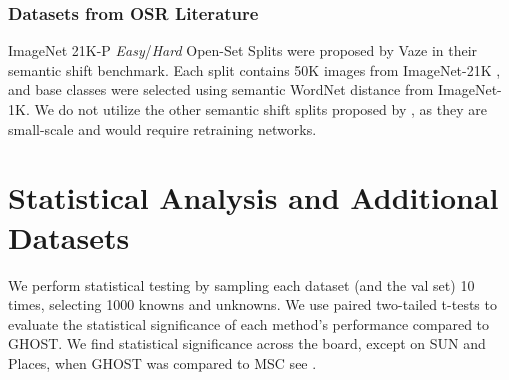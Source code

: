 \subsubsection{Datasets from OSR Literature}
\label{sec:datasets}
ImageNet 21K-P \emph{Easy}/\emph{Hard} Open-Set Splits were proposed by Vaze  in their semantic shift benchmark. 
Each split contains 50K images from ImageNet-21K \cite{ridnik2021}, and base classes were selected using semantic WordNet distance from ImageNet-1K.
We do not utilize the other semantic shift splits proposed by \cite{vaze2022openset}, as they are small-scale and would require retraining networks.

\section{Statistical Analysis and Additional Datasets}

We perform statistical testing by sampling each dataset (and the val set) 10 times, selecting 1000 knowns and unknowns.   
We use paired two-tailed t-tests to evaluate the statistical significance of each method's performance compared to GHOST. 
We find statistical significance across the board, except on SUN and Places, when GHOST was compared to MSC see .

